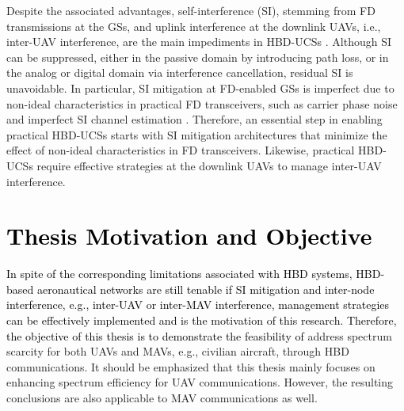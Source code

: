 Despite the associated advantages, self-interference (SI), stemming from FD transmissions at the GSs, and uplink interference at the downlink UAVs, i.e., inter-UAV interference, are the main impediments in HBD-UCSs \cite{ernest2019outage, tan2018joint, ernest2019power, ernest2019hybrid}. Although SI can be suppressed, either in the passive domain by introducing path loss, or in the analog or digital domain via interference cancellation, residual SI is unavoidable. In particular, SI mitigation at FD-enabled GSs is imperfect due to non-ideal characteristics in practical FD transceivers, such as carrier phase noise and imperfect SI channel estimation \cite{ernest2019outage, tan2018joint, ernest2019power, ernest2019hybrid, sahai2013impact}. Therefore, an essential step in enabling practical HBD-UCSs starts with SI mitigation architectures that minimize the effect of non-ideal characteristics in FD transceivers. Likewise, practical HBD-UCSs require effective strategies at the downlink UAVs to manage inter-UAV interference.

\section{\textcolor{black}{Thesis Motivation and Objective}}
\textcolor{black}{In spite of the corresponding limitations associated with HBD systems, HBD-based aeronautical networks are still tenable if SI mitigation and inter-node interference, e.g., inter-UAV or inter-MAV interference, management strategies can be effectively implemented and is the motivation of this research. Therefore, the objective of this thesis is to demonstrate the feasibility of} address spectrum scarcity for both UAVs and MAVs, e.g., civilian aircraft, through HBD communications. It should be emphasized that this thesis mainly focuses on enhancing spectrum efficiency for UAV communications. However, the resulting conclusions are also applicable to MAV communications as well.

